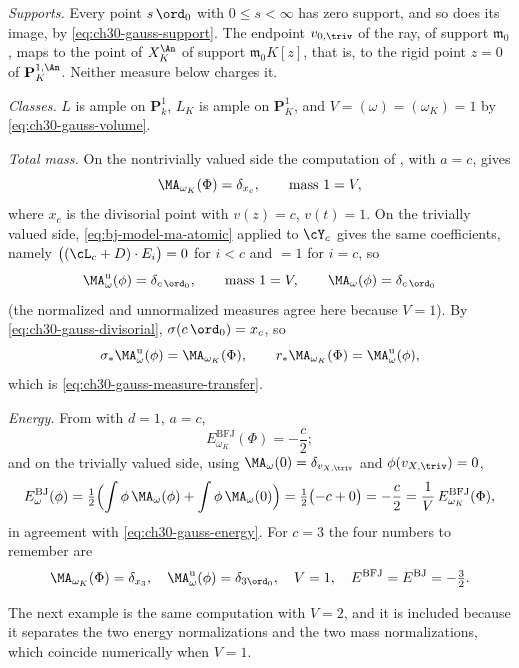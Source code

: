\begin{example}
\emph{Supports.}  Every point \(s\,\ord_0\) with \(0\leq s<\infty\) has zero
support, and so does its image, by
\eqref{eq:ch30-gauss-support}.  The endpoint \(v_{0,\triv}\) of the ray, of
support \(\mathfrak m_0\), maps to the point of \(X_K^{\An}\) of support
\(\mathfrak m_0K[z]\), that is, to the rigid point \(z=0\) of
\(\mathbf P^{1,\An}_K\).  Neither measure below charges it.

\emph{Classes.}  \(L\) is ample on \(\mathbf P^1_k\), \(L_K\) is ample on
\(\mathbf P^1_K\), and \(V=(\omega)=(\omega_K)=1\) by
\eqref{eq:ch30-gauss-volume}.

\emph{Total mass.}  On the nontrivially valued side the computation of
, with \(a=c\), gives
\[
 \MA_{\omega_K}(\Phi)=\delta_{x_c},
 \qquad \text{mass }1=V,
\]
where \(x_c\) is the divisorial point with \(v(z)=c\), \(v(t)=1\).  On the
trivially valued side, \eqref{eq:bj-model-ma-atomic} applied to
\(\cY_c\) gives the same coefficients, namely
\(\bigl((\cL_c+D)\cdot E_i\bigr)=0\) for \(i<c\) and \(=1\) for \(i=c\), so
\[
 \MA^{\mathrm u}_\omega(\phi)=\delta_{c\,\ord_0},
 \qquad\text{mass }1=V,
 \qquad
 \MA_\omega(\phi)=\delta_{c\,\ord_0}
\]
(the normalized and unnormalized measures agree here because \(V=1\)).  By
\eqref{eq:ch30-gauss-divisorial}, \(\sigma(c\,\ord_0)=x_c\), so
\[
 \sigma_*\MA^{\mathrm u}_\omega(\phi)=\MA_{\omega_K}(\Phi),
 \qquad
 r_*\MA_{\omega_K}(\Phi)=\MA^{\mathrm u}_\omega(\phi),
\]
which is \eqref{eq:ch30-gauss-measure-transfer}.

\emph{Energy.}  From  with \(d=1\), \(a=c\),
\[
 E^{\mathrm{BFJ}}_{\omega_K}(\Phi)=-\frac c2 ;
\]
and on the trivially valued side, using
\(\MA_\omega(0)=\delta_{v_{X,\triv}}\) and \(\phi(v_{X,\triv})=0\),
\[
 E^{\mathrm{BJ}}_\omega(\phi)
 =\tfrac12\Bigl(\int\phi\,\MA_\omega(\phi)+\int\phi\,\MA_\omega(0)\Bigr)
 =\tfrac12\bigl(-c+0\bigr)=-\frac c2
 =\frac1V\,E^{\mathrm{BFJ}}_{\omega_K}(\Phi),
\]
in agreement with \eqref{eq:ch30-gauss-energy}.  For \(c=3\) the four
numbers to remember are
\[
 \MA_{\omega_K}(\Phi)=\delta_{x_3},\quad
 \MA^{\mathrm u}_\omega(\phi)=\delta_{3\ord_0},\quad
 V=1,\quad
 E^{\mathrm{BFJ}}=E^{\mathrm{BJ}}=-\tfrac32 .
\]
\end{example}

The next example is the same computation with \(V=2\), and it is included
because it separates the two energy normalizations and the two mass
normalizations, which coincide numerically when \(V=1\).

